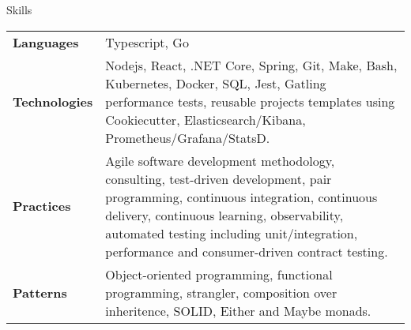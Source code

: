 \begin{section}{Skills}
  \begin{tabularx}{\linewidth}{@{}l X@{}}
    \textbf{Languages} &\small{Typescript, Go} \\
    \textbf{Technologies} &\small{Nodejs, React, .NET Core, Spring, Git, Make, Bash, Kubernetes, Docker, SQL, Jest, Gatling performance tests, reusable projects templates using Cookiecutter, Elasticsearch/Kibana, Prometheus/Grafana/StatsD.} \\ 
    \textbf{Practices} &\small{Agile software development methodology, consulting, test-driven development, pair programming, continuous integration, continuous delivery, continuous learning, observability, automated testing including unit/integration, performance and consumer-driven contract testing.} \\
    \textbf{Patterns} &\small{Object-oriented programming, functional programming, strangler, composition over inheritence, SOLID, Either and Maybe monads.} \\
  \end{tabularx}
\end{section}

